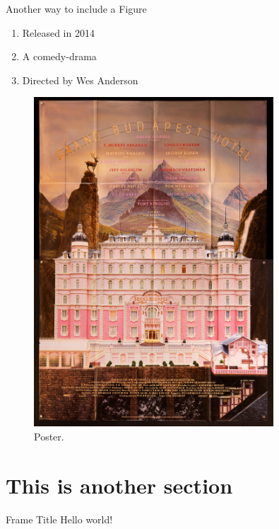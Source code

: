 \documentclass[10pt, xcolor = svgnames]{beamer} %
\begin{document}
\begin{frame}[fragile]{Another way to include a Figure}
\begin{minipage}{0.45\textwidth}
\begin{enumerate}
	\item Released in 2014
	\item A comedy-drama
	\item Directed by Wes Anderson
\end{enumerate}
\end{minipage}
\hspace{20pt}
\begin{minipage}{0.45\textwidth}
\begin{figure}
\centering
\includegraphics[width = 0.8\textwidth]{./fig/poster.jpg}
\caption{Poster.}
\label{fig1}
\end{figure}
\end{minipage}
\end{frame}







\section{This is another section}
\begin{frame}{Frame Title} %
    Hello world!
\end{frame}
\end{document}
